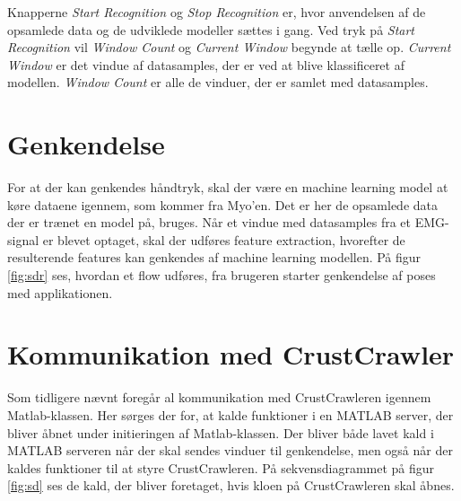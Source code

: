 Knapperne \textit{Start Recognition} og \textit{Stop Recognition} er, hvor anvendelsen af de opsamlede data og de udviklede modeller sættes i gang. Ved tryk på \textit{Start Recognition} vil \textit{Window Count} og \textit{Current Window} begynde at tælle op. \textit{Current Window} er det vindue af datasamples, der er ved at blive klassificeret af modellen. \textit{Window Count} er alle de vinduer, der er samlet med datasamples.

\section{Genkendelse}
For at der kan genkendes håndtryk, skal der være en machine learning model at køre dataene igennem, som kommer fra Myo'en. Det er her de opsamlede data der er trænet en model på, bruges. Når et vindue med datasamples fra et EMG-signal er blevet optaget, skal der udføres feature extraction, hvorefter de resulterende features kan genkendes af machine learning modellen. På figur \ref{fig:sdr} ses, hvordan et flow udføres, fra brugeren starter genkendelse af poses med applikationen.



\section{Kommunikation med CrustCrawler}
\label{sec:ktc}
Som tidligere nævnt foregår al kommunikation med CrustCrawleren igennem Matlab-klassen. Her sørges der for, at kalde funktioner i en MATLAB server, der bliver åbnet under initieringen af Matlab-klassen. Der bliver både lavet kald i MATLAB serveren når der skal sendes vinduer til genkendelse, men også når der kaldes funktioner til at styre CrustCrawleren. På sekvensdiagrammet på figur \ref{fig:sd} ses de kald, der bliver foretaget, hvis kloen på CrustCrawleren skal åbnes.

